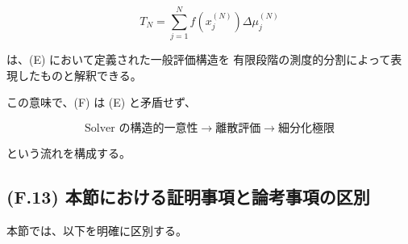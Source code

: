 \documentclass[a4paper,11pt]{article}
\begin{document}
\begin{equation}
    T_N
    =
    \sum_{j=1}^{N}
    f\!\left(x_j^{(N)}\right)
    \Delta\mu_j^{(N)}
\end{equation}

は、(E) において定義された一般評価構造を
有限段階の測度的分割によって表現したものと解釈できる。

この意味で、(F) は (E) と矛盾せず、

\begin{equation}
    \boxed{
        \text{Solver の構造的一意性}
        \longrightarrow
        \text{離散評価}
        \longrightarrow
        \text{細分化極限}
    }
\end{equation}

という流れを構成する。


\subsection{(F.13) 本節における証明事項と論考事項の区別}
\label{subsec:F13}

本節では、以下を明確に区別する。
\end{document}

